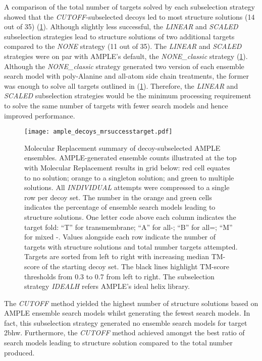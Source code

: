 A comparison of the total number of targets solved by each subselection strategy showed that the \textit{CUTOFF}-subselected decoys led to most structure solutions (14 out of 35) (\cref{fig:ample_decoys_mrsuccesstarget}). Although slightly less successful, the \textit{LINEAR} and \textit{SCALED} subselection strategies lead to structure solutions of two additional targets compared to the \textit{NONE} strategy (11 out of 35). The \textit{LINEAR} and \textit{SCALED} strategies were on par with AMPLE's default, the \textit{NONE\_classic} strategy (\cref{fig:ample_decoys_mrsuccesstarget}). Although the \textit{NONE\_classic} strategy generated two version of each ensemble search model with poly-Alanine and all-atom side chain treatments, the former was enough to solve all targets outlined in (\cref{fig:ample_decoys_mrsuccesstarget}). Therefore, the \textit{LINEAR} and \textit{SCALED} subselection strategies would be the minimum processing requirement to solve the same number of targets with fewer search models and hence improved performance.

\begin{figure}[H]
    \centering
    \texttt{[image: ample\_decoys\_mrsuccesstarget.pdf]}
\caption[Molecular Replacement summary of decoy-subselected ensembles]{Molecular Replacement summary of decoy-subselected AMPLE ensembles. AMPLE-generated ensemble counts illustrated at the top with Molecular Replacement results in grid below: red cell equates to no solution; orange to a singleton solution; and green to multiple solutions. All \textit{INDIVIDUAL} attempts were compressed to a single row per decoy set. The number in the orange and green cells indicates the percentage of ensemble search models leading to structure solutions. One letter code above each column indicates the target fold: ``T'' for transmembrane; ``A'' for all-\textalpha; ``B'' for all=\textbeta; ``M'' for mixed \textalpha-\textbeta. Values alongside each row indicate the number of targets with structure solutions and total number targets attempted. Targets are sorted from left to right with increasing median TM-score of the starting decoy set. The black lines highlight TM-score thresholds from 0.3 to 0.7 from left to right. The subselection strategy \textit{IDEALH} refers AMPLE's ideal helix library.}
    \label{fig:ample_decoys_mrsuccesstarget}
\end{figure}

The \textit{CUTOFF} method yielded the highest number of structure solutions based on AMPLE ensemble search models whilst generating the fewest search models. In fact, this subselection strategy generated no ensemble search models for target 2bhw. Furthermore, the \textit{CUTOFF} method achieved amongst the best ratio of search models leading to structure solution compared to the total number produced. 

